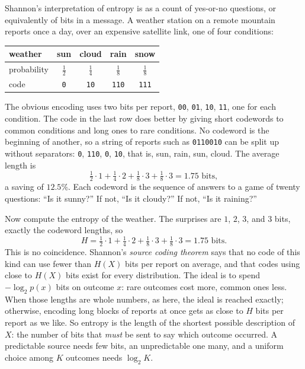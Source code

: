 Shannon's interpretation of entropy is as a count of yes-or-no questions,
or equivalently of bits in a message. A weather station on a remote
mountain reports once a day, over an expensive satellite link, one of
four conditions:
\begin{center}
  \begin{tabular}{@{}lcccc@{}}
    \toprule
    weather & sun & cloud & rain & snow \\
    \midrule
    probability & $\tfrac12$ & $\tfrac14$ & $\tfrac18$ & $\tfrac18$ \\
    code & \texttt{0} & \texttt{10} & \texttt{110} & \texttt{111} \\
    \bottomrule
  \end{tabular}
\end{center}
The obvious encoding uses two bits per report, \texttt{00}, \texttt{01},
\texttt{10}, \texttt{11}, one for each condition. The code in the last row
does better by giving short codewords to common conditions and long ones
to rare conditions. No codeword is the beginning of another, so a string
of reports such as \texttt{0110010} can be split up without separators:
\texttt{0}, \texttt{110}, \texttt{0}, \texttt{10}, that is, sun, rain,
sun, cloud. The average length is
\[
  \tfrac12 \cdot 1 + \tfrac14 \cdot 2 + \tfrac18 \cdot 3 + \tfrac18 \cdot 3
  = 1.75 \text{ bits},
\]
a saving of $12.5\%$. Each codeword is the sequence of answers to a game
of twenty questions: ``Is it sunny?'' If not, ``Is it cloudy?'' If not,
``Is it raining?''

Now compute the entropy of the weather. The surprises are $1$, $2$, $3$,
and $3$ bits, exactly the codeword lengths, so
\[
  H = \tfrac12 \cdot 1 + \tfrac14 \cdot 2 + \tfrac18 \cdot 3 + \tfrac18
  \cdot 3 = 1.75 \text{ bits}.
\]
This is no coincidence. Shannon's \emph{source coding theorem} says that
no code of this kind can use fewer than $H(X)$ bits per report on
average, and that codes using close to $H(X)$ bits exist for every
distribution. The ideal is to spend $-\log_2 p(x)$ bits on outcome $x$:
rare outcomes cost more, common ones less. When those lengths are whole
numbers, as here, the ideal is reached exactly; otherwise, encoding long
blocks of reports at once gets as close to $H$ bits per report as we
like. So entropy is the length of the shortest possible description of
$X$: the number of bits that \emph{must} be sent to say which outcome
occurred. A predictable source needs few bits, an unpredictable one many,
and a uniform choice among $K$ outcomes needs $\log_2 K$.

